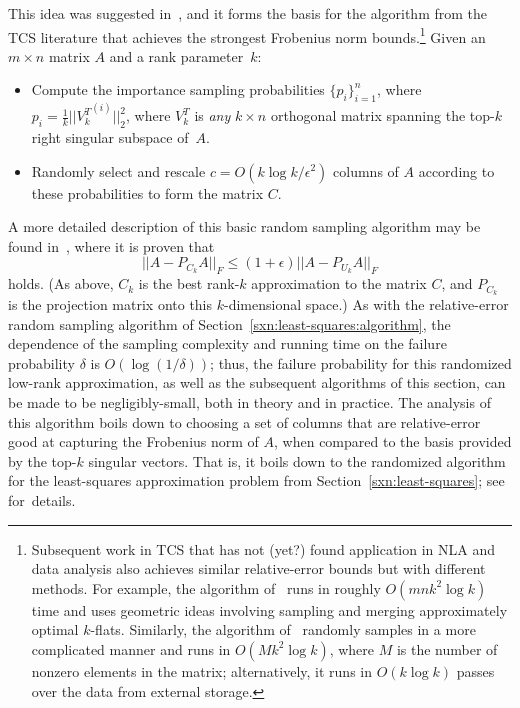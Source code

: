 \documentclass[twoside]{article}
\begin{document}
This idea was suggested in~\cite{DMM08_CURtheory_JRNL,CUR_PNAS}, and it 
forms the basis for the algorithm from the TCS literature that achieves the 
strongest Frobenius norm bounds.\footnote{Subsequent work in TCS that has not (yet?) found application in 
NLA and data analysis also achieves similar relative-error bounds but with different
methods.  For example, the algorithm of~\cite{HarPeled06_relerr_DRAFT} runs 
in roughly $O(mnk^2 \log k)$ time and uses geometric ideas involving 
sampling and merging approximately optimal $k$-flats.  Similarly, the 
algorithm of~\cite{DV06_relerr_TR} randomly samples in a more complicated 
manner and runs in $O(Mk^2 \log k)$, where $M$ is the number of nonzero 
elements in the matrix; alternatively, it runs in $O(k \log k)$ passes over the data from external 
storage.}
Given an $m \times n$ matrix $A$ and a rank parameter~$k$:
\begin{itemize}
\item
Compute the importance sampling probabilities $\{p_i\}_{i=1}^{n}$, where 
$p_i=\frac{1}{k}||{V_k^T}^{(i)}||_2^2$, where $V_k^T$ is \emph{any} 
$k \times n$ orthogonal matrix spanning the top-$k$ right singular subspace 
of~$A$.
\item
Randomly select and rescale $c = O(k \log k /\epsilon^2)$ columns of $A$
according to these probabilities to form the matrix $C$.
\end{itemize}
A more detailed description of this basic random sampling algorithm may be 
found in~\cite{DMM08_CURtheory_JRNL,CUR_PNAS}, where it is proven that
\begin{equation}
||A-P_{C_k}A||_F \le (1+\epsilon) ||A-P_{U_k}A ||_F  
\label{eqn:rel-err}
\end{equation}
holds.   (As above, $C_k$ is the best rank-$k$ approximation to the matrix $C$, and 
$P_{C_k}$ is the projection matrix onto this $k$-dimensional space.)
As with the relative-error random sampling algorithm of 
Section~\ref{sxn:least-squares:algorithm}, the dependence of the sampling 
complexity and running time on the failure probability $\delta$ is 
$O(\log(1/\delta))$;
thus, the failure probability for this randomized low-rank approximation, 
as well as the subsequent algorithms of this section, can be made to be 
negligibly-small, both in theory and in practice.
The analysis of this algorithm boils down to choosing a set of columns 
that are relative-error good at capturing the Frobenius norm of $A$, when
compared to the basis provided by the top-$k$ singular vectors.
That is, it boils down to the randomized algorithm for the least-squares 
approximation problem from Section~\ref{sxn:least-squares}; 
see~\cite{DMM08_CURtheory_JRNL,CUR_PNAS} for~details.
\end{document}
